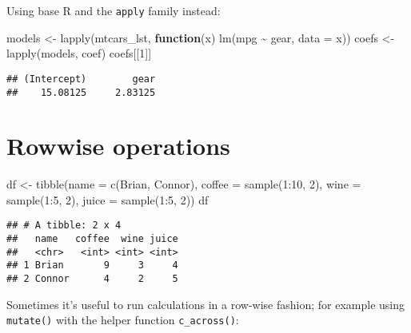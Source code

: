 \documentclass[
]{book}
\newenvironment{Shaded}{\begin{snugshade}}{\end{snugshade}}
\newcommand{\AttributeTok}[1]{\textcolor[rgb]{0.77,0.63,0.00}{#1}}
\newcommand{\ControlFlowTok}[1]{\textcolor[rgb]{0.13,0.29,0.53}{\textbf{#1}}}
\newcommand{\DecValTok}[1]{\textcolor[rgb]{0.00,0.00,0.81}{#1}}
\newcommand{\FunctionTok}[1]{\textcolor[rgb]{0.00,0.00,0.00}{#1}}
\newcommand{\NormalTok}[1]{#1}
\newcommand{\OtherTok}[1]{\textcolor[rgb]{0.56,0.35,0.01}{#1}}
\newcommand{\SpecialCharTok}[1]{\textcolor[rgb]{0.00,0.00,0.00}{#1}}
\newcommand{\StringTok}[1]{\textcolor[rgb]{0.31,0.60,0.02}{#1}}
\begin{document}
Using base R and the \texttt{apply} family instead:

\begin{Shaded}
\begin{Highlighting}[]
\NormalTok{models }\OtherTok{\textless{}{-}} \FunctionTok{lapply}\NormalTok{(mtcars\_lst, }\ControlFlowTok{function}\NormalTok{(x) }\FunctionTok{lm}\NormalTok{(mpg }\SpecialCharTok{\textasciitilde{}}\NormalTok{ gear, }\AttributeTok{data =}\NormalTok{ x))}
\NormalTok{coefs }\OtherTok{\textless{}{-}} \FunctionTok{lapply}\NormalTok{(models, coef)}
\NormalTok{coefs[[}\DecValTok{1}\NormalTok{]]}
\end{Highlighting}
\end{Shaded}

\begin{verbatim}
## (Intercept)        gear 
##    15.08125     2.83125
\end{verbatim}

\hypertarget{rowwise-operations}{%
\section{Rowwise operations}\label{rowwise-operations}}

\begin{Shaded}
\begin{Highlighting}[]
\NormalTok{df }\OtherTok{\textless{}{-}} \FunctionTok{tibble}\NormalTok{(}\AttributeTok{name =} \FunctionTok{c}\NormalTok{(}\StringTok{\textquotesingle{}Brian\textquotesingle{}}\NormalTok{, }\StringTok{\textquotesingle{}Connor\textquotesingle{}}\NormalTok{),}
             \AttributeTok{coffee =} \FunctionTok{sample}\NormalTok{(}\DecValTok{1}\SpecialCharTok{:}\DecValTok{10}\NormalTok{, }\DecValTok{2}\NormalTok{),}
             \AttributeTok{wine =} \FunctionTok{sample}\NormalTok{(}\DecValTok{1}\SpecialCharTok{:}\DecValTok{5}\NormalTok{, }\DecValTok{2}\NormalTok{),}
             \AttributeTok{juice =} \FunctionTok{sample}\NormalTok{(}\DecValTok{1}\SpecialCharTok{:}\DecValTok{5}\NormalTok{, }\DecValTok{2}\NormalTok{))}
\NormalTok{df}
\end{Highlighting}
\end{Shaded}

\begin{verbatim}
## # A tibble: 2 x 4
##   name   coffee  wine juice
##   <chr>   <int> <int> <int>
## 1 Brian       9     3     4
## 2 Connor      4     2     5
\end{verbatim}

Sometimes it's useful to run calculations in a row-wise fashion; for example using \texttt{mutate()} with the helper function \texttt{c\_across()}:
\end{document}
